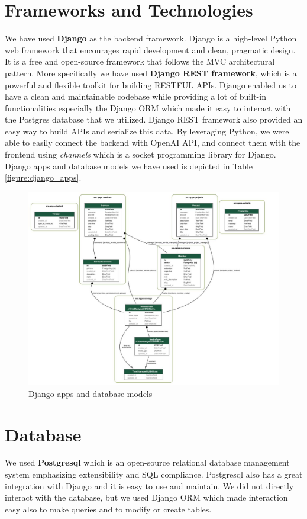 \section{Frameworks and Technologies}
We have used \textbf{Django} as the backend framework.
Django is a high-level Python web framework that encourages rapid development and clean, pragmatic design.
It is a free and open-source framework that follows the MVC architectural pattern.
More specifically we have used \textbf{Django REST framework}, which is a powerful and flexible toolkit for building RESTFUL APIs.
Django enabled us to have a clean and maintainable codebase while providing a lot of built-in functionalities especially the Django ORM which made it easy to interact with the Postgres database that we utilized. Django REST framework also provided  an easy way to build APIs and serialize this data.
By leveraging Python, we were able to easily connect the backend with OpenAI API, and connect them with the frontend using \textit{channels} which is a socket programming library for Django.
Django apps and database models we have used is depicted in Table \ref{figure:django_apps}.

\begin{figure}[htbp]
    \centering
    \includegraphics[width=0.4\linewidth]{img/django.jpeg}
    \caption{Django apps and database models}
    \label{fig:django_apps}
\end{figure}

\section{Database}
We used \textbf{Postgresql} which is an open-source relational database management system emphasizing extensibility and SQL compliance.
Postgresql also has a great integration with Django and it is easy to use and maintain.
We did not directly interact with the database, but we used Django ORM which made interaction easy also to make queries and to modify or create tables.

